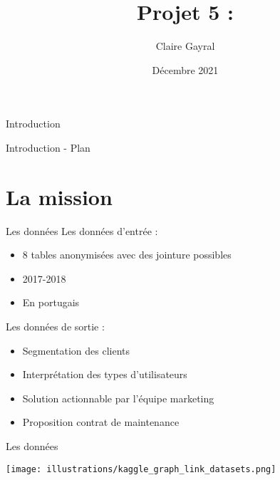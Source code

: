 \documentclass[10pt]{beamer}
\title{Projet 5 : }
\author{Claire Gayral}
\date{Décembre 2021}
\begin{document}
\begin{frame}{}
    \frametitle{}
    \titlepage
\end{frame}
\begin{frame}{Introduction}

\end{frame}
\begin{frame}{Introduction - Plan}
    \tableofcontents
\end{frame}

\section{La mission}

\begin{frame}{Les données}
Les données d'entrée : 
\begin{itemize}
    \item 8 tables anonymisées avec des jointure possibles
    \item 2017-2018 
    \item En portugais\\
\end{itemize}
\vspace{0.5cm}
Les données de sortie :
\begin{itemize}
    \item Segmentation des clients
    \item Interprétation des types d'utilisateurs
    \item Solution actionnable par l'équipe marketing
    \item Proposition contrat de maintenance
\end{itemize}
\end{frame}
\begin{frame}{Les données}
       \begin{center}
           \texttt{[image: illustrations/kaggle\_graph\_link\_datasets.png]}
       \end{center}
\end{frame}
\end{document}
